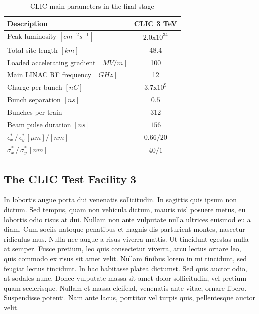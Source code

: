\begin{table}[h]
  \centering
    \begin{tabular}{ l c  }
    \hline
    \hline
    \textbf{Description}						& \textbf{CLIC 3 TeV}	\\
    \hline
    Peak luminosity $[cm^{-2} s^{-1}]$				& $2.0\text{x}10^{34}$	\\
    Total site length $[km]$						& 48.4				\\
    Loaded accelerating gradient $[MV/m]$			& 100	\\
    Main LINAC RF frequency	$[GHz]$			& 12	\\
    Charge per bunch $ [nC]$					& $3.7\text{x}10^{9}$ \\
    Bunch separation $[ns]$					& $0.5$ \\
    Bunches per train							& $312$ \\
    Beam pulse duration $[ns]$					& $156$ \\
    $\epsilon^*_x \, / \, \epsilon^*_y \, [\mu m]/[nm]$	& $0.66/20$ \\  
    $\sigma^*_x\, / \, \sigma^*_y\, [nm]$			& $40/1$	\\
    
    \hline
    \hline
    \end{tabular}
  \caption{CLIC main parameters in the final stage}
\label{table_CLIC_params}
\end{table}








\subsection[CTF3]{The CLIC Test Facility 3}

In lobortis augue porta dui venenatis sollicitudin. In sagittis quis ipsum non dictum. Sed tempus, quam non vehicula dictum, mauris nisl posuere metus, eu lobortis odio risus at dui. Nullam non ante vulputate nulla ultrices euismod eu a diam. Cum sociis natoque penatibus et magnis dis parturient montes, nascetur ridiculus mus. Nulla nec augue a risus viverra mattis. Ut tincidunt egestas nulla at semper. Fusce pretium, leo quis consectetur viverra, arcu lectus ornare leo, quis commodo ex risus sit amet velit. Nullam finibus lorem in mi tincidunt, sed feugiat lectus tincidunt. In hac habitasse platea dictumst. Sed quis auctor odio, at sodales nunc. Donec vulputate massa sit amet dolor sollicitudin, vel pretium quam scelerisque. Nullam et massa eleifend, venenatis ante vitae, ornare libero. Suspendisse potenti. Nam ante lacus, porttitor vel turpis quis, pellentesque auctor velit.

